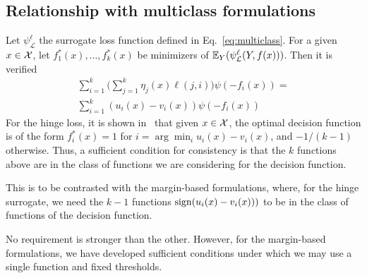 




\subsection{Relationship with multiclass formulations}\label{subsec:multiclass}

Let $\psi_{\mathcal{L}}^{\ell}$ the surrogate loss function defined in Eq.~\eqref{eq:multiclass}. For a given $x \in \mathcal{X}$,  let $f^*_1(x),\dots,f^*_k(x)$ be minimizers of $\mathbb{E}_Y(\psi_{\mathcal{L}}^{\ell}(Y, f(x)))$. Then it is verified
$$
\begin{aligned}
\sum_{i=1}^k \bigg( \sum_{j=1}^k  \eta_j(x) \ell(j,i)  \bigg) \psi(-f_i(x))
=  \\
\sum_{i=1}^k (u_i(x) - v_i(x)) \psi(-f_i(x))
\end{aligned}
$$
For the hinge loss, it is shown in~\citet{lee2004multicategory} that given $x \in \mathcal{X}$, the optimal decision function is of the form $f^*_i(x) = 1 $ for $i= \arg\min_{i} u_i(x) - v_i(x)$, and $-1/(k-1)$ otherwise. Thus, a sufficient condition for consistency is that the $k$ functions above are in the class of functions we are considering for the decision function.

This is to be contrasted with the margin-based formulations, where, for the hinge surrogate, we need the $k-1$ functions
${\rm sign}( u_i(x) - v_i(x)))$ to be in the class of functions of the decision function.
 
No requirement is stronger than the other. However, for the margin-based formulations, we have developed sufficient conditions under which we may use a single function and fixed thresholds.


